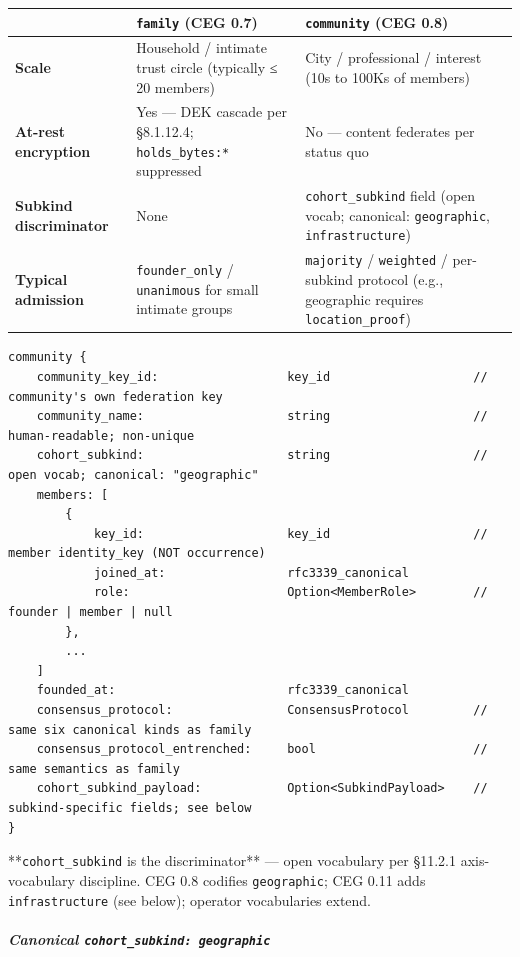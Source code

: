 \documentclass[11pt]{article}
\begin{document}
{\footnotesize
\begin{longtable}{|p{5.33cm}|p{5.33cm}|p{5.33cm}|}\hline
\textbf{} & \textbf{\texttt{family} (CEG 0.7)} & \textbf{\texttt{community} (CEG 0.8)} \\ \hline\endhead
\textbf{Scale} & Household / intimate trust circle (typically ≤ 20 members) & City / professional / interest (10s to 100Ks of members) \\ \hline
\textbf{At-rest encryption} & Yes — DEK cascade per §8.1.12.4; \texttt{holds\_bytes:*} suppressed & No — content federates per status quo \\ \hline
\textbf{Subkind discriminator} & None & \texttt{cohort\_subkind} field (open vocab; canonical: \texttt{geographic}, \texttt{infrastructure}) \\ \hline
\textbf{Typical admission} & \texttt{founder\_only} / \texttt{unanimous} for small intimate groups & \texttt{majority} / \texttt{weighted} / per-subkind protocol (e.g., geographic requires \texttt{location\_proof}) \\ \hline
\end{longtable}}


\begin{lstlisting}
community {
    community_key_id:                  key_id                    // community's own federation key
    community_name:                    string                    // human-readable; non-unique
    cohort_subkind:                    string                    // open vocab; canonical: "geographic"
    members: [
        {
            key_id:                    key_id                    // member identity_key (NOT occurrence)
            joined_at:                 rfc3339_canonical
            role:                      Option<MemberRole>        // founder | member | null
        },
        ...
    ]
    founded_at:                        rfc3339_canonical
    consensus_protocol:                ConsensusProtocol         // same six canonical kinds as family
    consensus_protocol_entrenched:     bool                      // same semantics as family
    cohort_subkind_payload:            Option<SubkindPayload>    // subkind-specific fields; see below
}
\end{lstlisting}

**\texttt{cohort\_subkind} is the discriminator** — open vocabulary per §11.2.1 axis-vocabulary discipline. CEG 0.8 codifies \texttt{geographic}; CEG 0.11 adds \texttt{infrastructure} (see below); operator vocabularies extend.


\subparagraph{Canonical \texttt{cohort\_subkind: geographic}}\mbox{}\\
\end{document}
